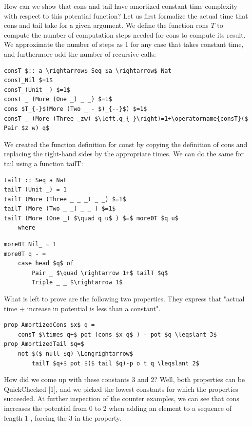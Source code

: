 \documentclass[10pt]{article}
\begin{document}
How can we show that cons and tail have amortized constant time complexity with respect to this potential function? Let us first formalize the actual time that cons and tail take for a given argument. We define the function cons $T$ to compute the number of computation steps needed for cons to compute its result. We approximate the number of steps as 1 for any case that takes constant time, and furthermore add the number of recursive calls:

\begin{verbatim}
consT $:: a \rightarrow$ Seq $a \rightarrow$ Nat
consT_Nil $=1$
consT_(Unit _) $=1$
consT _ (More (One _) _ _) $=1$
cons $T_{-}$(More (Two _ - $)_{--}$) $=1$
consT _ (More (Three _zw) $\left.q_{-}\right)=1+\operatorname{consT}($ Pair $z w) q$
\end{verbatim}

We created the function definition for const by copying the definition of cons and replacing the right-hand sides by the appropriate times. We can do the same for tail using a function tailT:

\begin{verbatim}
tailT :: Seq a Nat
tailT (Unit _) = 1
tailT (More (Three _ _ _) _ _) $=1$
tailT (More (Two _ _) _ _ ) $=1$
tailT (More (One _) $\quad q u$ ) $=$ more0T $q u$
    where
\end{verbatim}

\begin{verbatim}
more0T Nil_ = 1
more0T q - =
    case head $q$ of
        Pair _ $\quad \rightarrow 1+$ tailT $q$
        Triple _ _ $\rightarrow 1$
\end{verbatim}

What is left to prove are the following two properties. They express that "actual time + increase in potential is less than a constant".

\begin{verbatim}
prop_AmortizedCons $x$ q =
    consT $\times q+$ pot (cons $x q$ ) - pot $q \leqslant 3$
prop_AmortizedTail $q=$
    not $($ null $q) \Longrightarrow$
        tailT $q+$ pot $($ tail $q)-p o t q \leqslant 2$
\end{verbatim}

How did we come up with these constants 3 and 2? Well, both properties can be QuickChecked [1], and we picked the lowest constants for which the properties succeeded. At further inspection of the counter examples, we can see that cons increases the potential from 0 to 2 when adding an element to a sequence of length 1 , forcing the 3 in the property.
\end{document}

